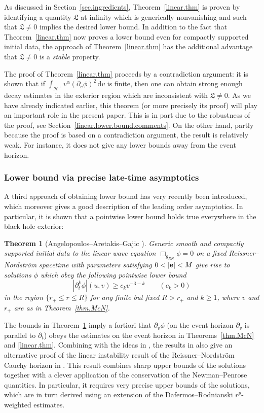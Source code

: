 \documentclass[10pt, reqno]{amsart}
\newtheorem{theorem}{Theorem}[section]
\theoremstyle{definition}
\theoremstyle{remark}
\theoremstyle{conjecture}
\numberwithin{equation}{section}
\newcommand{\ud}{\mathrm{d}}
\newcommand{\rd}{\partial}
\newcommand{\0}{\emptyset}
\newcommand{\alp}{\alpha}
\newcommand{\calH}{\mathcal H}
\newcommand{\EH}{\calH^{+}}
\begin{document}
As discussed in Section~\ref{sec.ingredients}, Theorem~\ref{linear.thm} is proven by identifying a quantity $\mathfrak L$ at infinity which is generically nonvanishing and such that $\mathfrak L\neq 0$ implies the desired lower bound. In addition to the fact that Theorem~\ref{linear.thm} now proves a lower bound even for compactly supported initial data, the approach of Theorem~\ref{linear.thm} has the additional advantage that $\mathfrak L\neq 0$ is a \emph{stable} property.

The proof of Theorem~\ref{linear.thm} proceeds by a contradiction argument: it is shown that if $\int_{\EH} v^{\alp} (\rd_{v} \phi)^{2} \, \ud v$ is finite, then one can obtain strong enough decay estimates in the exterior region which are inconsistent with $\mathfrak L\neq 0$. As we have already indicated earlier, this theorem (or more precisely its proof) will play an important role in the present paper. This is in part due to the robustness of the proof, see Section~\ref{linear.lower.bound.comments}. On the other hand, partly because the proof is based on a contradiction argument, the result is relatively weak. For instance, it does not give any lower bounds away from the event horizon.


\subsubsection{Lower bound via precise late-time asymptotics}

A third approach of obtaining lower bound has very recently been introduced, which moreover gives a good description of the leading order asymptotics. In particular, it is shown that a pointwise lower bound holds true everywhere in the black hole exterior:
\begin{theorem}[Angelopoulos--Aretakis--Gajic \cite{AAG}]\label{thm.AAG}
Generic smooth and compactly supported initial data to the linear wave equation $\Box_{g_{RN}}\phi=0$ on a fixed Reissner--Nordstr\"om spacetime with parameters satisfying $0<|{\bf e}|<M$ give rise to solutions $\phi$ which obey the following \emph{pointwise} lower bound
$$|\rd_t^k \phi|(u,v) \geq c_k v^{-3-k} \qquad (c_{k} > 0) $$
in the region $\{r_+\leq r\leq R\}$ for any finite but fixed $R>r_+$ and $k \geq 1$, where $v$ and $r_+$ are as in Theorem~\ref{thm.McN}.
\end{theorem}
The bounds in Theorem~\ref{thm.AAG} imply a fortiori that $\rd_v\phi$ (on the event horizon $\rd_v$ is parallel to $\rd_t$) obeys the estimates on the event horizon in Theorems~\ref{thm.McN} and \ref{linear.thm}. Combining with the ideas in \cite{D2}, the results in \cite{AAG} also give an alternative proof of the linear instability result of the Reissner--Nordstr\"om Cauchy horizon in \cite{LO.instab}. This result combines sharp upper bounds of the solutions together with a clever application of the conservation of the Newman--Penrose quantities. In particular, it requires very precise upper bounds of the solutions, which are in turn derived using an extension of the Dafermos--Rodnianski $r^p$-weighted estimates. 
\end{document}
